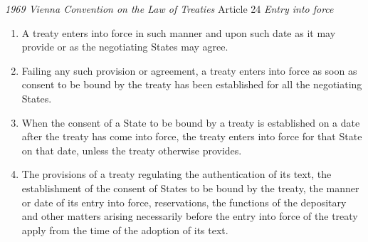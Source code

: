 \begin{conventiondetails}{\textit{1969 Vienna Convention on the Law of Treaties} Article 24}\label{VCLT Art 24}
    \flushleft
    \textit{Entry into force}
    \begin{enumerate}
        \item A treaty enters into force in such manner and upon such date as it may provide or as the 
        negotiating States may agree. 
        \item Failing any such provision or agreement, a treaty enters into force as soon as consent to be bound by the treaty has been established for all the negotiating States. 
        \item When the consent of a State to be bound by a treaty is established on a date after the treaty has come into force, the treaty enters into force for that State on that date, unless the treaty otherwise provides. 
        \item The provisions of a treaty regulating the authentication of its text, the establishment of the consent of States to be bound by the treaty, the manner or date of its entry into force, reservations, the functions of the depositary and other matters arising necessarily before the entry into force of the treaty apply from the time of the adoption of its text.
    \end{enumerate}
\end{conventiondetails}

